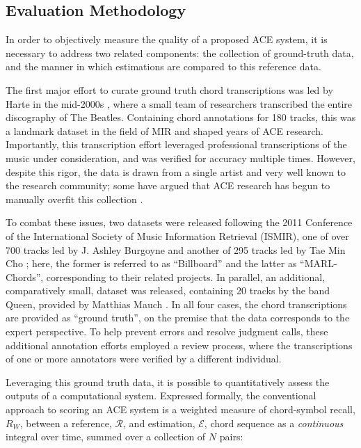 \subsection{Evaluation Methodology}
\label{subsec:eval_methodology}

In order to objectively measure the quality of a proposed ACE system, it is necessary to address two related components: the collection of ground-truth data, and the manner in which estimations are compared to this reference data.

The first major effort to curate ground truth chord transcriptions was led by Harte in the mid-2000s \cite{Isophonics}, where a small team of researchers transcribed the entire discography of The Beatles.
Containing chord annotations for 180 tracks, this was a landmark dataset in the field of MIR and shaped years of ACE research.
Importantly, this transcription effort leveraged professional transcriptions of the music under consideration, and was verified for accuracy multiple times.
However, despite this rigor, the data is drawn from a single artist and very well known to the research community; some have argued that ACE research has begun to manually overfit this collection \cite{complaint}.

To combat these issues, two datasets were released following the 2011 Conference of the International Society of Music Information Retrieval (ISMIR), one of over 700 tracks led by J. Ashley Burgoyne \cite{Burgoyne2011} and another of 295 tracks led by Tae Min Cho \cite{Cho2011b}; here, the former is referred to as ``Billboard'' and the latter as ``MARL-Chords'', corresponding to their related projects.
In parallel, an additional, comparatively small, dataset was released, containing 20 tracks by the band Queen, provided by Matthias Mauch \cite{Mauch2009x}.
In all four cases, the chord transcriptions are provided as ``ground truth'', on the premise that the data corresponds to the expert perspective.
To help prevent errors and resolve judgment calls, these additional annotation efforts employed a review process, where the transcriptions of one or more annotators were verified by a different individual.

Leveraging this ground truth data, it is possible to quantitatively assess the outputs of a computational system.
Expressed formally, the conventional approach to scoring an ACE system is a weighted measure of chord-symbol recall, $R_{W}$, between a reference, $\mathcal{R}$, and estimation, $\mathcal{E}$, chord sequence as a \emph{continuous} integral over time, summed over a collection of $N$ pairs:

